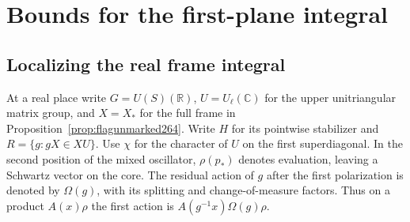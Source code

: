 \documentclass[a4paper,11pt]{article}
\theoremstyle{definition}
\theoremstyle{remark}
\numberwithin{equation}{section}
\begin{document}
\section{Bounds for the first-plane integral}\label{nav:g-X-1}

\subsection{Localizing the real frame integral}\label{nav:I-57}
At a real place write \(G=U(S)(\mathbb R)\),
\(U=U_\ell(\mathbb C)\) for the upper unitriangular matrix
group, and \(X=X_*\) for the full frame in
Proposition~\ref{prop:flagunmarked264}. Write \(H\) for its
pointwise stabilizer and \(R=\{g:gX\in XU\}\).
Use \(\chi\) for the character of \(U\) on the first
superdiagonal. In the second position of the mixed oscillator,
\(\rho(p_*)\) denotes evaluation, leaving a Schwartz vector
on the core. The residual action of \(g\) after the first
polarization is denoted by \(\Omega(g)\), with its splitting
and change-of-measure factors. Thus on a product \(A(x)\rho\)
the first action is \(A(g^{-1}x)\Omega(g)\rho\).
\end{document}

